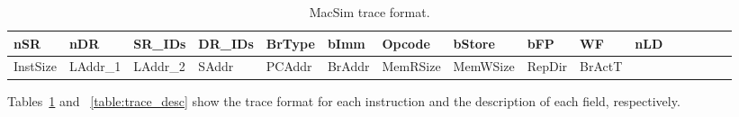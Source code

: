 \ignore
		{
		\begin{table}[htb]
		\begin{footnotesize}
		\begin{center}
		\caption{MacSim trace format.}
		\label{table:trace_format}
		\begin{tabular}{|l|l|l|l|l|l|l|l|l|l|l|l|l|l|l|l|} 
		\hline
		nSR & nDR & SR\_IDs & DR\_IDs & BrType & bImm & Opcode & bStore & bFP & WF & nLD  \\ \hline \hline
		InstSize & LAddr\_1 & LAddr\_2 & SAddr & PCAddr & BrAddr & MemRSize & MemWSize & RepDir & BrActT & \\ \hline
		\end{tabular}
		\end{center}
		\end{footnotesize}
		\end{table}

		Tables~\ref{table:trace_format} and ~\ref{table:trace_desc} show the trace
		format for each instruction and the description of each field, respectively.
		}

 
